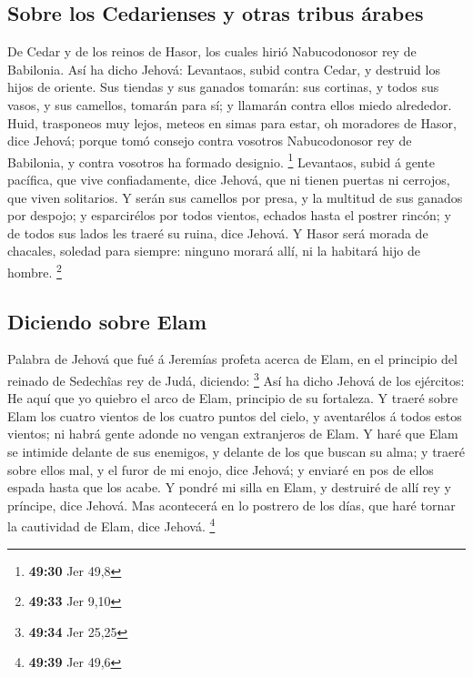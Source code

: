 \hypertarget{sobre-los-cedarienses-y-otras-tribus-uxe1rabes}{%
\subsection{Sobre los Cedarienses y otras tribus
árabes}\label{sobre-los-cedarienses-y-otras-tribus-uxe1rabes}}

 De Cedar y de los reinos de Hasor, los cuales hirió
Nabucodonosor rey de Babilonia. Así ha dicho Jehová: Levantaos, subid
contra Cedar, y destruid los hijos de oriente.  Sus
tiendas y sus ganados tomarán: sus cortinas, y todos sus vasos, y sus
camellos, tomarán para sí; y llamarán contra ellos miedo alrededor.
 Huid, trasponeos muy lejos, meteos en simas para estar,
oh moradores de Hasor, dice Jehová; porque tomó consejo contra vosotros
Nabucodonosor rey de Babilonia, y contra vosotros ha formado designio.
\footnote{\textbf{49:30} Jer 49,8}  Levantaos, subid á
gente pacífica, que vive confiadamente, dice Jehová, que ni tienen
puertas ni cerrojos, que viven solitarios.  Y serán sus
camellos por presa, y la multitud de sus ganados por despojo; y
esparcirélos por todos vientos, echados hasta el postrer rincón; y de
todos sus lados les traeré su ruina, dice Jehová.  Y
Hasor será morada de chacales, soledad para siempre: ninguno morará
allí, ni la habitará hijo de hombre. \footnote{\textbf{49:33} Jer 9,10}

\hypertarget{diciendo-sobre-elam}{%
\subsection{Diciendo sobre Elam}\label{diciendo-sobre-elam}}

 Palabra de Jehová que fué á Jeremías profeta acerca de
Elam, en el principio del reinado de Sedechîas rey de Judá, diciendo:
\footnote{\textbf{49:34} Jer 25,25}  Así ha dicho Jehová
de los ejércitos: He aquí que yo quiebro el arco de Elam, principio de
su fortaleza.  Y traeré sobre Elam los cuatro vientos de
los cuatro puntos del cielo, y aventarélos á todos estos vientos; ni
habrá gente adonde no vengan extranjeros de Elam.  Y haré
que Elam se intimide delante de sus enemigos, y delante de los que
buscan su alma; y traeré sobre ellos mal, y el furor de mi enojo, dice
Jehová; y enviaré en pos de ellos espada hasta que los acabe.
 Y pondré mi silla en Elam, y destruiré de allí rey y
príncipe, dice Jehová.  Mas acontecerá en lo postrero de
los días, que haré tornar la cautividad de Elam, dice Jehová.
\footnote{\textbf{49:39} Jer 49,6}

